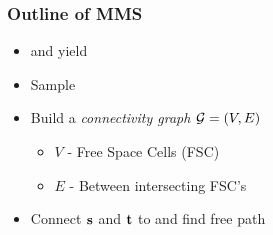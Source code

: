 \documentclass{beamer}
\begin{document}
\begin{frame}
  \frametitle{Outline of MMS}
  \begin{itemize}
  \item \robot{} and \wspace{} yield \cspace{}
  \item Sample \cspace{}
  \item Build a \emph{connectivity graph} \(\mathcal{G}{} = \left( V,E \right)\)
    \begin{itemize}
    \item \(V\) - Free Space Cells (FSC)
    \item \(E\) - Between intersecting FSC's
    \end{itemize}
  \item Connect \(\cp{s}\) and \(\cp{t}\) to \roadmap{} and find free path
  \end{itemize}
  \begin{center}
  \end{center}
\end{frame}
\end{document}
